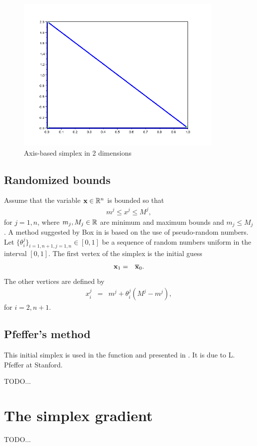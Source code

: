 \begin{figure}
\begin{center}
\includegraphics[width=10cm]{simplex_axes.png}
\end{center}
\caption{Axis-based simplex in 2 dimensions}
\label{fig-nm-simplex-axes}
\end{figure}

\subsection{Randomized bounds}

Assume that the variable $\mathbf{x}\in\mathbb{R}^n$ is bounded so that 
\begin{eqnarray}
m^j \leq x^j \leq M^j,
\end{eqnarray}
for $j=1,n$, where $m_j,M_j\in\mathbb{R}$ are minimum and maximum bounds and $m_j\leq M_j$.
A method suggested by Box in \cite{Box1965} is based on the use of 
pseudo-random numbers. Let $\{\theta_i^j\}_{i=1,n+1,j=1,n}\in[0,1]$ be 
a sequence of random numbers uniform in the interval $[0,1]$.
The first vertex of the simplex is the initial guess 
\begin{eqnarray}
\mathbf{x}_1 &=& \overline{\mathbf{x}}_0.
\end{eqnarray}
The other vertices are defined by 
\begin{eqnarray}
x_i^j &=& m^j + \theta_i^j (M^j - m^j),
\end{eqnarray}
for $i=2,n+1$.

\subsection{Pfeffer's method}

This initial simplex is used in the function 
and presented in \cite{Fan2002}. It is due to L. Pfeffer at Stanford.

TODO...

\section{The simplex gradient}

TODO...

